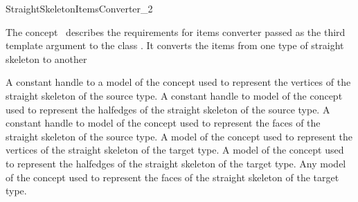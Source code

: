 
\begin{ccRefConcept}{StraightSkeletonItemsConverter_2}


\ccDefinition

The concept \ccRefName\ describes the requirements for items converter passed as the third template argument to the class . It converts the  items from one type of straight skeleton to another

\ccTypes
  {A constant handle to a model of the  concept 
  used to represent the vertices of the straight skeleton of the source type.}{}
  \ccGlue
   {A constant handle to model of the  concept 
    used to represent the halfedges of the straight skeleton of the source type.}{}
  \ccGlue
  {A constant handle to model of the  concept 
   used to represent the faces of the straight skeleton of the source type.}{}
  \ccGlue
  {A model of the  concept used to represent the vertices 
  of the straight skeleton of the target type.}{}
  \ccGlue
  {A model of the  concept used to represent the halfedges
   of the straight skeleton of the target type.}{}
  \ccGlue
  {Any model of the  concept used to represent the faces 
   of the straight skeleton of the target type.}{}


\end{ccRefConcept}
